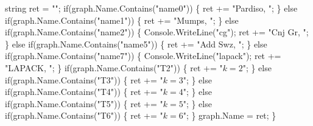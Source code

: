 { \newline 
\btab string ret = "";\newline 
\btab if(graph.Name.Contains("name0")) \{\newline 
\btab \btab ret += "Pardiso, ";\newline 
\btab \} else if(graph.Name.Contains("name1")) \{\newline 
\btab \btab ret += "Mumps, ";\newline 
\btab \} else if(graph.Name.Contains("name2")) \{\newline 
\btab \btab Console.WriteLine("cg");\newline 
\btab \btab ret += "Cnj Gr, ";\newline 
\btab \} else if(graph.Name.Contains("name5")) \{\newline 
\btab \btab ret += "Add Swz, ";\newline 
\btab \} else if(graph.Name.Contains("name7")) \{\newline 
\btab \btab Console.WriteLine("lapack");\newline 
\btab \btab ret += "LAPACK, ";\newline 
\btab \} \newline 
\btab if(graph.Name.Contains("T2")) \{\newline 
\btab \btab ret += "$ k = 2 $";\newline 
\btab \} else if(graph.Name.Contains("T3")) \{\newline 
\btab \btab ret += "$ k = 3 $";\newline 
\btab \} else if(graph.Name.Contains("T4")) \{\newline 
\btab \btab ret += "$ k = 4 $";\newline 
\btab \} else if(graph.Name.Contains("T5")) \{\newline 
\btab \btab ret += "$ k = 5 $";\newline 
\btab \} else if(graph.Name.Contains("T6")) \{\newline 
\btab \btab ret += "$ k = 6 $";\newline 
\btab \}\newline 
 \newline 
\btab graph.Name = ret;\newline 
\}
 }
\BoSSSexe
\BoSSScmd{
 }
\BoSSSexe
\BoSSScmd{
 }
\BoSSSexe
\BoSSScmd{
 }
\BoSSSexe
{}
\BoSSSexe
{}
\BoSSSexe
